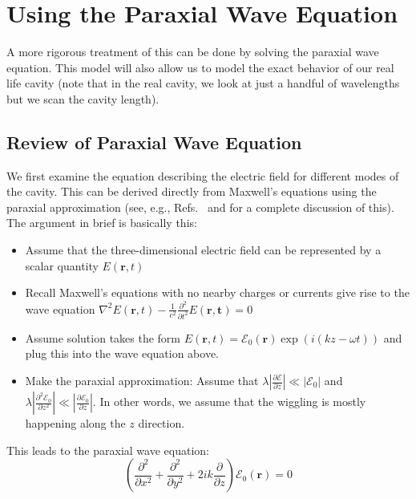 \section{Using the Paraxial Wave Equation}

A more rigorous treatment of this can be done by solving the paraxial wave equation. This model will also allow us to model the exact behavior of our real life cavity (note that in the real cavity, we look at just a handful of wavelengths but we scan the cavity length).

\subsection{Review of Paraxial Wave Equation}

We first examine the equation describing the electric field for different modes of the cavity. This can be derived directly from Maxwell's equations using the paraxial approximation (see, e.g., Refs.\ \cite{lasersMilonniEberly} and \cite{bergeson_amo_notes} for a complete discussion of this). The argument in brief is basically this: 

\begin{itemize}
\item Assume that the three-dimensional electric field can be represented by a scalar quantity $E(\mathbf{r},t)$
\item Recall Maxwell's equations with no nearby charges or currents give rise to the wave equation $\nabla^2E(\mathbf{r},t)-\frac{1}{c^2} \frac{\partial^2}{\partial t^2} E(\mathbf{r,t})=0$
\item Assume solution takes the form $E(\mathbf{r},t) = \mathcal{E}_0(\mathbf{r}) \exp(i(kz-\omega t))$ and plug this into the wave equation above. 
\item Make the paraxial approximation: Assume that $\lambda \left|\frac{\partial \mathcal{E}}{\partial z} \right| \ll |\mathcal{E}_0|$ and $\lambda \left| \frac{\partial^2\mathcal{E}_0}{\partial z^2}\right| \ll \left| \frac{\partial \mathcal{E}_0}{\partial z}\right|$. In other words, we assume that the wiggling
is mostly happening along the $z$ direction. 
\end{itemize}

This leads to the paraxial wave equation: 
\begin{equation}
\left(\frac{\partial^2}{\partial x^2}+\frac{\partial^2}{\partial y^2}+2ik\frac{\partial}{\partial z}\right) \mathcal{E}_0(\mathbf{r})=0 \label{final_paraxial_wave_eqn}
\end{equation}

